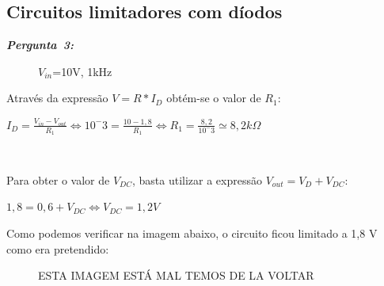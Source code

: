\documentclass[pdftex,12pt,a4paper]{report}
\begin{document}
\subsection{Circuitos limitadores com díodos}
\hbox{\emph{\textbf{Pergunta 3:}\newline}}

\begin{figure}[h]
\centerline{}
\caption{$V_{in}$=10V, 1kHz}\label{circuito13}
\end{figure}
Através da expressão $V = R*I_D$ obtém-se o valor de $R_1$:\newline
\centerline{$I_D = \frac{V_{in} - V_{out}}{R_1} \Leftrightarrow 10^-3 = \frac{10-1,8}{R_1} \Leftrightarrow R_1 = \frac{8,2}{10^-3} \simeq 8,2k\Omega$}\\
\vspace{0.1cm}

Para obter o valor de $V_{DC}$, basta utilizar a expressão $V_{out} = V_D + V_{DC}$:
\centerline{$ 1,8 = 0,6 + V_{DC} \Leftrightarrow V_{DC} = 1,2V$}

Como podemos verificar na imagem abaixo, o circuito ficou limitado a 1,8 V como era pretendido:

\begin{figure}[h]
\centerline{}
\caption{ESTA IMAGEM ESTÁ MAL TEMOS DE LA VOLTAR }\label{grafico_1c_osciloscopio}
\end{figure}

\newpage
\end{document}
